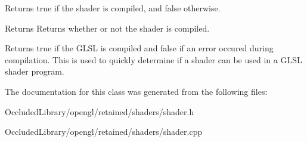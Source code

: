 Returns true if the shader is compiled, and false otherwise. 

\begin{DoxyReturn}{Returns}
Returns whether or not the shader is compiled.
\end{DoxyReturn}
Returns true if the G\+L\+S\+L is compiled and false if an error occured during compilation. This is used to quickly determine if a shader can be used in a G\+L\+S\+L shader program. 

The documentation for this class was generated from the following files\+:\begin{DoxyCompactItemize}
\item 
Occluded\+Library/opengl/retained/shaders/shader.\+h\item 
Occluded\+Library/opengl/retained/shaders/shader.\+cpp\end{DoxyCompactItemize}
